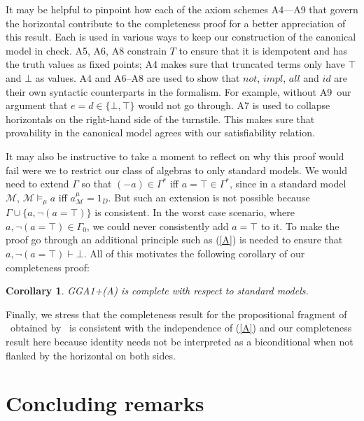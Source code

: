 \documentclass{preprint}
\newtheorem{corollary}[theorem]{Corollary}
\newcommand{\M}{\mathcal{M}}
\newcommand{\GGA}{\textsf{GGA1}}
\newcommand{\iv}{A4}%
\newcommand{\ahor}{A5}%
\newcommand{\aneg}{A6}%
\newcommand{\aimp}{A7}%
\newcommand{\aquant}{A8}%
\newcommand{\aid}{A9}%
\renewcommand{\to}{\supvar}
\begin{document}
It may be helpful to pinpoint how each of the axiom schemes {\iv---\aid} that govern the horizontal contribute to the completeness proof for a better appreciation of this result. Each is used in various ways to keep our construction of the canonical model in check.  {\ahor}, {\aneg}, {\aquant} constrain $T$ to ensure that it is idempotent and has the truth values as fixed points; {\iv} makes sure that truncated terms only have $\top$ and $\bot$ as values. {\iv} and {\aneg--\aquant} are used to show that $not$, $impl$, $all$ and $id$ are their own syntactic counterparts in the formalism. For example, without \aid~our argument that $e = d \in \{\bot, \top\}$ would not go through. {\aimp} is used to collapse horizontals on the right-hand side of the turnstile. This makes sure that provability in the canonical model agrees with our satisfiability relation.  


It may also be instructive to take a moment to reflect on why this proof would fail were we to restrict our class of algebras to only standard models.  
We would need to extend $\Gamma$ so that $(-a) \in \Gamma^*$ iff $a = \top \in \Gamma^*$, since in a standard model~$\M$, $\M \vDash_\mu a $ iff $a_\M^\mu = 1_D$. 
But such an extension is not possible because $\Gamma \cup \{a, \neg (a = \top) \}$ is consistent. In the worst case scenario, where $a, \neg (a = \top) \in \Gamma_0$, we could never consistently add $a = \top$ to it. To make the proof go through an additional principle such as (\ref{A}) is needed 
to ensure that $a, \neg (a = \top) \vdash \bot$. All of this motivates the following corollary of our completeness proof: 

\begin{corollary}
	\GGA+(A) is complete with respect to standard models. 
\end{corollary}


Finally, we stress that the completeness result for the propositional fragment of \gga~obtained by~\citet[\S3.5]{cadetpanza2015logical} is consistent with the independence of (\ref{A}) and our completeness result here because identity needs not be interpreted as a biconditional when not flanked by the horizontal on both sides. 

\section{Concluding remarks} \label{conclusion}
\end{document}
